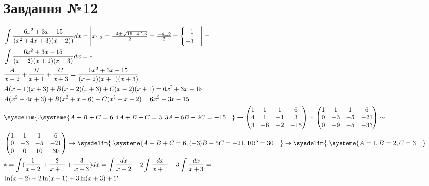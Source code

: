 \documentclass{report}
\begin{document}
\section{Завдання №12}
\begin{equation}\label{eq12}\begin{split}
	& \int \frac{6x^2 + 3x - 15}{(x^2 + 4x + 3)(x - 2))}dx = \begin{vmatrix}x_{1, 2} = \frac{-4 \pm \sqrt{16 - 4 \cdot 1 \cdot 3}}{2} = \frac{-4 \pm 2}{2} = \begin{cases}-1\\-3\end{cases}\end{vmatrix} =\\
	& \int \frac{6x^2 + 3x - 15}{(x - 2)(x + 1)(x + 3)}dx = \ast\\
	& \frac{A}{x-2} + \frac{B}{x+1} + \frac{C}{x +3} = \frac{6x^2 + 3x - 15}{(x - 2)(x + 1)(x + 3)}\\
	& A(x + 1)(x + 3) + B(x - 2)(x + 3) + C(x - 2)(x + 1) = 6x^2 + 3x - 15\\
	& A(x^2 + 4x + 3) + B(x^2 + x - 6) + C(x^2 - x - 2) = 6x^2 + 3x - 15\\
	& \sysdelim\{.\systeme{A + B + C = 6, 4A + B - C = 3, 3A - 6B - 2C = -15\quad} \to \begin{pmatrix}1 & 1 & 1 & 6\\ 4 & 1 & -1 & 3\\ 3 & -6 & -2 & -15\end{pmatrix} \sim \begin{pmatrix}1 & 1 & 1 & 6\\ 0 & -3 & -5 & -21\\ 0 & -9 & -5 & -33\end{pmatrix} \sim\\
	& \begin{pmatrix}1 & 1 & 1 & 6\\ 0 & -3 & -5 & -21\\ 0 & 0 & 10 & 30\end{pmatrix} \to \sysdelim\{.\systeme{A + B + C = 6, (-3)B - 5C = -21, 10C = 30\quad} \to \sysdelim\{.\systeme{A = 1, B = 2, C = 3\quad}\\
	& \ast = \int(\frac{1}{x-2} + \frac{2}{x+1} + \frac{3}{x + 3})dx = \int\frac{dx}{x-2} + 2\int\frac{dx}{x+1} + 3\int\frac{dx}{x + 3} =\\
	& \ln(x - 2) + 2\ln(x + 1) + 3\ln(x + 3) + C 
\end{split}\end{equation}
\end{document}
